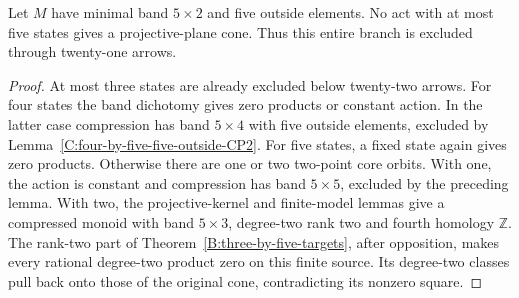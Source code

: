 \begin{corollary}
\label{C:five-row-five-outside-five-states}
Let $M$ have minimal band $5\times2$ and five outside elements.
No act with at most five states gives a projective-plane cone.
Thus this entire branch is excluded through twenty-one arrows.
\end{corollary}
\begin{proof}
At most three states are already excluded below twenty-two
arrows.  For four states the band dichotomy gives zero products
or constant action.  In the latter case compression has band
$5\times4$ with five outside elements, excluded by
Lemma~\ref{C:four-by-five-five-outside-CP2}.
For five states, a fixed state again gives zero products.
Otherwise there are one or two two-point core orbits.
With one, the action is constant and compression has band
$5\times5$, excluded by the preceding lemma.
With two, the projective-kernel and finite-model lemmas give
a compressed monoid with band $5\times3$, degree-two rank
two and fourth homology $\mathbb Z$.
The rank-two part of
Theorem~\ref{B:three-by-five-targets}, after opposition,
makes every rational degree-two product zero on this finite
source.  Its degree-two classes pull back onto those of the
original cone, contradicting its nonzero square.
\end{proof}
